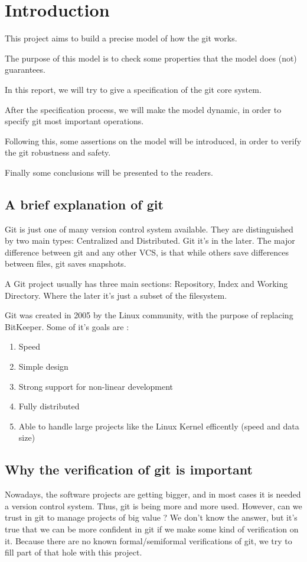 \section{Introduction}

This project aims to build a precise model of how the git works. \par
The purpose of this model is to check some properties that the model does
(not) guarantees.\par
In this report, we will try to give a specification
of the git core system. \par
After the specification process, we will make the
model dynamic, in order to specify git most important operations. \par
Following this, some assertions on the model will be
introduced, in order
to verify the git robustness and safety. \par
Finally some conclusions will be presented to the readers.

\subsection{A brief explanation of git}

Git is just one of many \Gls{version control system} available. 
They are 
distinguished by two main types: Centralized and Distributed.
Git it's in the later. The major difference between git and any
other VCS, is that while others save differences between files, git saves
snapshots. \par
A Git project usually has three main sections: Repository, Index and
Working Directory. Where the later it's just a subset of the filesystem. \par
Git was created in 2005 by the Linux community, 
with the purpose of replacing BitKeeper. Some of it's
goals are \cite{progit}: 

\begin{enumerate}
	\item Speed
	\item Simple design
	\item Strong support for non-linear development
	\item Fully distributed
	\item Able to handle large projects like the Linux Kernel 
	efficently (speed and data size)
\end{enumerate}

\subsection{Why the verification of git is important}

Nowadays, the software projects are getting bigger, and in most
cases it is needed a version control system. Thus, git is being
more and more used. However, can we trust in git to manage projects
of big value ? We don't know the answer, but it's true that we can be
more confident in git if we make some kind of verification on it. Because
there are no known formal/semiformal verifications of git, we try to fill
part of that hole with this project.
